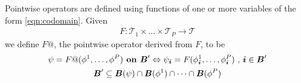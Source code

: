 \documentclass[12pt]{article}
\begin{document}
Pointwise operators are defined using functions of one or more variables of the form \eqref{eqn:codomain}. Given 
\begin{gather*}
F: \mathcal{T}_1 \times \dots \times \mathcal{T}_P \rightarrow \mathcal{T}
\end{gather*}
we define $F@$, the pointwise operator derived from $F$, to be 
\begin{gather}
\psi = F@(\phi^1 , \dots, \phi^P) \hbox{\bf{ on }} {\boldsymbol{B}}' \Leftrightarrow 
\psi_{\boldsymbol{i}} = F(\phi^1_{\boldsymbol{i}}, \dots , \phi^P_{\boldsymbol{i}}) \hbox{ , } {\boldsymbol{i}} \in {\boldsymbol{B}}' \label{eqn:pointwise}\\
{\boldsymbol{B}}' \subseteq {\boldsymbol{B}}(\psi) \cap {\boldsymbol{B}}(\phi^1) \cap \dots \cap {\boldsymbol{B}}(\phi^P) \nonumber
\end{gather}



%
%
%
%
\end{document}

